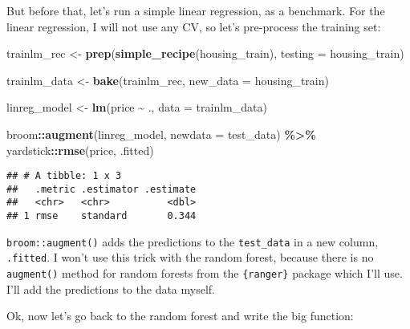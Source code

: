 \documentclass[
]{article}
\newenvironment{Shaded}{\begin{snugshade}}{\end{snugshade}}
\newcommand{\DataTypeTok}[1]{\textcolor[rgb]{0.13,0.29,0.53}{#1}}
\newcommand{\KeywordTok}[1]{\textcolor[rgb]{0.13,0.29,0.53}{\textbf{#1}}}
\newcommand{\NormalTok}[1]{#1}
\newcommand{\OperatorTok}[1]{\textcolor[rgb]{0.81,0.36,0.00}{\textbf{#1}}}
\newcommand{\StringTok}[1]{\textcolor[rgb]{0.31,0.60,0.02}{#1}}
\begin{document}
But before that, let's run a simple linear regression, as a benchmark. For the linear regression, I will
not use any CV, so let's pre-process the training set:

\begin{Shaded}
\begin{Highlighting}[]
\NormalTok{trainlm\_rec \textless{}{-}}\StringTok{ }\KeywordTok{prep}\NormalTok{(}\KeywordTok{simple\_recipe}\NormalTok{(housing\_train), }\DataTypeTok{testing =}\NormalTok{ housing\_train)}

\NormalTok{trainlm\_data \textless{}{-}}\StringTok{ }\KeywordTok{bake}\NormalTok{(trainlm\_rec, }\DataTypeTok{new\_data =}\NormalTok{ housing\_train)}

\NormalTok{linreg\_model \textless{}{-}}\StringTok{ }\KeywordTok{lm}\NormalTok{(price }\OperatorTok{\textasciitilde{}}\StringTok{ }\NormalTok{., }\DataTypeTok{data =}\NormalTok{ trainlm\_data)}

\NormalTok{broom}\OperatorTok{::}\KeywordTok{augment}\NormalTok{(linreg\_model, }\DataTypeTok{newdata =}\NormalTok{ test\_data) }\OperatorTok{\%\textgreater{}\%}\StringTok{ }
\StringTok{    }\NormalTok{yardstick}\OperatorTok{::}\KeywordTok{rmse}\NormalTok{(price, .fitted)}
\end{Highlighting}
\end{Shaded}

\begin{verbatim}
## # A tibble: 1 x 3
##   .metric .estimator .estimate
##   <chr>   <chr>          <dbl>
## 1 rmse    standard       0.344
\end{verbatim}

\texttt{broom::augment()} adds the predictions to the \texttt{test\_data} in a new column, \texttt{.fitted}. I won't
use this trick with the random forest, because there is no \texttt{augment()} method for random forests
from the \texttt{\{ranger\}} package which I'll use. I'll add the predictions to the data myself.

Ok, now let's go back to the random forest and write the big function:
\end{document}
